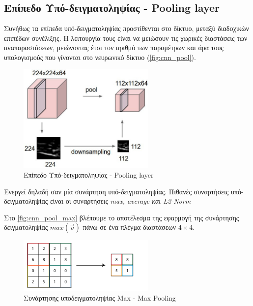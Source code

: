 \subsection{Επίπεδο Υπό-δειγματοληψίας - Pooling layer}

Συνήθως τα επίπεδα υπό-δειγματοληψίας προστίθενται στο δίκτυο, μεταξύ διαδοχικών
επιπέδων συνέλιξης. Η λειτουργία τους είναι να μειώσουν τις χωρικές
διαστάσεις των αναπαραστάσεων, μειώνοντας έτσι τον αριθμό των
παραμέτρων και άρα τους υπολογισμούς που γίνονται στο νευρωνικό δίκτυο
(\autoref{fig:cnn_pool}).

\begin{figure}[!ht]
  \centering
  \includegraphics[width=0.6\textwidth]{./images/chapter3/cnn_pool.jpg}
  \caption[Επίπεδο Υποδειγματοληψίας - Pooling layer]{Επίπεδο Υπό-δειγματοληψίας - Pooling layer}
  \label{fig:cnn_pool}
\end{figure}
Ενεργεί δηλαδή σαν μία συνάρτηση υπό-δειγματοληψίας.
Πιθανές συναρτήσεις υπό-δειγματοληψίας είναι οι συναρτήσεις \emph{max, average και L2-Norm}

Στο \autoref{fig:cnn_pool_max} βλέπουμε το αποτέλεσμα της εφαρμογή της συνάρτησης
δειγματοληψίας $max(\vec{v})$ πάνω σε ένα πλέγμα διαστάσεων $4 \times 4$.

\begin{figure}[!ht]
  \centering
  \includegraphics[width=0.6\textwidth]{./images/chapter3/cnn_pool_max.png}
  \caption[Συνάρτηση υπό-δειγματοληψίας Max - Max Pooling]{Συνάρτησης υποδειγματοληψίας Max - Max Pooling}
  \label{fig:cnn_pool_max}
\end{figure}


